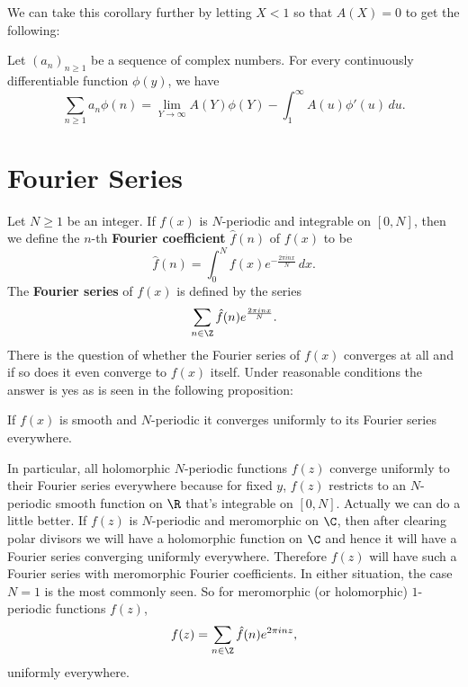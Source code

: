     We can take this corollary further by letting $X < 1$ so that $A(X) = 0$ to get the following:

    \begin{corollary}\label{cor:Abels_summation_formula_limit_version_specialization}
      Let $(a_{n})_{n \ge 1}$ be a sequence of complex numbers. For every continuously differentiable function $\phi(y)$, we have
      \[
        \sum_{n \ge 1}a_{n}\phi(n) = \lim_{Y \to \infty}A(Y)\phi(Y)-\int_{1}^{\infty}A(u)\phi'(u)\,du.
      \]
    \end{corollary}
  \section{Fourier Series}\label{append:Fourier_Series}
    Let $N \ge 1$ be an integer. If $f(x)$ is $N$-periodic and integrable on $[0,N]$, then we define the $n$-th \textbf{Fourier coefficient} $\hat{f}(n)$ of $f(x)$ to be
    \[
      \hat{f}(n) = \int_{0}^{N}f(x)e^{-\frac{2\pi inx}{N}}\,dx.
    \]
    The \textbf{Fourier series} of $f(x)$ is defined by the series
    \[
      \sum_{n \in \Z}\hat{f}(n)e^{\frac{2\pi inx}{N}}.
    \]
    There is the question of whether the Fourier series of $f(x)$ converges at all and if so does it even converge to $f(x)$ itself. Under reasonable conditions the answer is yes as is seen in the following proposition:

    \begin{proposition}
      If $f(x)$ is smooth and $N$-periodic it converges uniformly to its Fourier series everywhere.
    \end{proposition}

    In particular, all holomorphic $N$-periodic functions $f(z)$ converge uniformly to their Fourier series everywhere because for fixed $y$, $f(z)$ restricts to an $N$-periodic smooth function on $\R$ that's integrable on $[0,N]$. Actually we can do a little better. If $f(z)$ is $N$-periodic and meromorphic on $\C$, then after clearing polar divisors we will have a holomorphic function on $\C$ and hence it will have a Fourier series converging uniformly everywhere. Therefore $f(z)$ will have such a Fourier series with meromorphic Fourier coefficients. In either situation, the case $N = 1$ is the most commonly seen. So for meromorphic (or holomorphic) $1$-periodic functions $f(z)$,
    \[
      f(z) = \sum_{n \in \Z}\hat{f}(n)e^{2\pi inz},
    \]
    uniformly everywhere.
